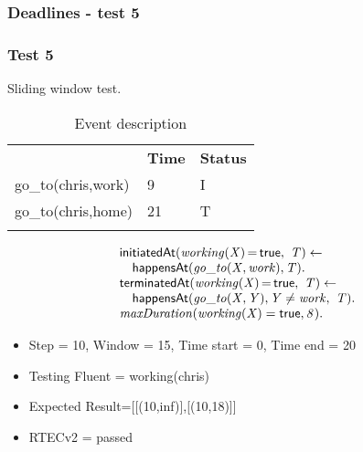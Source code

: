 \documentclass[8pt]{beamer}
\DeclareMathOperator{\val}{=}  %
\def \patsize {}
\def\happensAt{\textsf{\patsize happensAt}}
\def\initiatedAt{\textsf{\patsize initiatedAt}}
\def\terminatedAt{\textsf{\patsize terminatedAt}}
\def\true{\textsf{\patsize true}}
\newenvironment{mysplit}%
  {\arraycolsep 0pt \begin{array}{l}}%
  {\end{array}}
\begin{document}
\begin{frame}
    \frametitle{Deadlines - test 5}
    \subsubsection{Test 5}
    \small
    Sliding window test.\linebreak
    \begin{minipage}{0.48\linewidth}
        \begin{table}[t!]
            \caption{Event description}
            \begin{center}

                \begin{tabular}{lll}
                    \hline\noalign{\smallskip}
                    \multicolumn{1}{l}{\textbf{Event}} & \multicolumn{1}{c}{\textbf{Time}} & \multicolumn{1}{c}{\textbf{Status}} \\
                    go\_to(chris,work)& 9 & I\\
                    go\_to(chris,home)& 21 & T\\
                    \noalign{\smallskip}
                    \hline
                \end{tabular}
            \end{center}
        \end{table}
    \end{minipage}
    \begin{minipage}{0.48\linewidth}
        \begin{align*}
            \begin{mysplit}
                \initiatedAt\mathit{(working(X)\val\true,\ T)\leftarrow}\\
                \quad    \happensAt\mathit{(go\_to(X,work),T)}.\\
                \terminatedAt\mathit{(working(X)\val\true,\ T) \leftarrow}\\
                \quad    \happensAt\mathit{(go\_to(X,Y),Y\neq work,\ T)}.\\
                \mathit{maxDuration(working(X)=\true,8)}.\\
            \end{mysplit}
        \end{align*}
    \end{minipage}
    \begin{itemize}
        \item  Step = 10, Window = 15, Time start = 0, Time end = 20
        \item Testing Fluent = working(chris)
        \item Expected Result=[[(10,inf)],[(10,18)]]
        \item RTECv2 = passed
    \end{itemize}
\end{frame}
\end{document}
